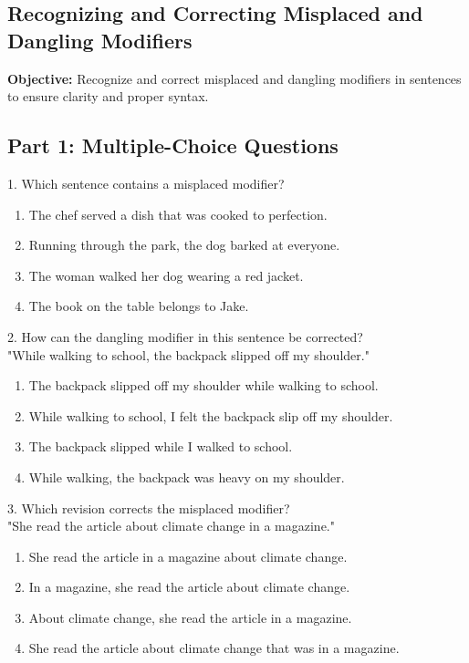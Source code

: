 \documentclass[12pt]{article}
\begin{document}
\subsection*{Recognizing and Correcting Misplaced and Dangling Modifiers}
\onehalfspacing

\begin{tcolorbox}[colframe=black!40, colback=gray!0, title=Learning Objective]
\textbf{Objective:} Recognize and correct misplaced and dangling modifiers in sentences to ensure clarity and proper syntax.
\end{tcolorbox}

\subsection*{Part 1: Multiple-Choice Questions}

1. Which sentence contains a misplaced modifier?  
\begin{enumerate}[label=\Alph*.]
    \item The chef served a dish that was cooked to perfection.  
    \item Running through the park, the dog barked at everyone.  
    \item The woman walked her dog wearing a red jacket.  
    \item The book on the table belongs to Jake.  
\end{enumerate}

\vspace{1cm}

2. How can the dangling modifier in this sentence be corrected? \\  
"While walking to school, the backpack slipped off my shoulder."  
\begin{enumerate}[label=\Alph*.]
    \item The backpack slipped off my shoulder while walking to school.  
    \item While walking to school, I felt the backpack slip off my shoulder.  
    \item The backpack slipped while I walked to school.  
    \item While walking, the backpack was heavy on my shoulder.  
\end{enumerate}

\vspace{1cm}

3. Which revision corrects the misplaced modifier? \\  
"She read the article about climate change in a magazine."  
\begin{enumerate}[label=\Alph*.]
    \item She read the article in a magazine about climate change.  
    \item In a magazine, she read the article about climate change.  
    \item About climate change, she read the article in a magazine.  
    \item She read the article about climate change that was in a magazine.  
\end{enumerate}
\end{document}

